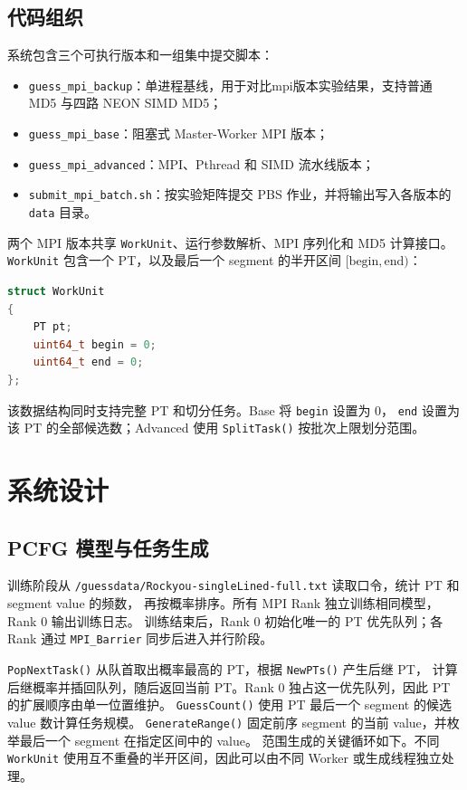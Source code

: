 \documentclass[UTF8,a4paper,12pt]{ctexart}
\newcommand{\code}[1]{\texttt{#1}}
\begin{document}
\subsection{代码组织}

系统包含三个可执行版本和一组集中提交脚本：

\begin{itemize}
  \item \code{guess\_mpi\_backup}：单进程基线，用于对比mpi版本实验结果，支持普通 MD5 与四路 NEON SIMD MD5；
  \item \code{guess\_mpi\_base}：阻塞式 Master-Worker MPI 版本；
  \item \code{guess\_mpi\_advanced}：MPI、Pthread 和 SIMD 流水线版本；
  \item \code{submit\_mpi\_batch.sh}：按实验矩阵提交 PBS 作业，并将输出写入各版本的
  \code{data} 目录。
\end{itemize}

两个 MPI 版本共享 \code{WorkUnit}、运行参数解析、MPI 序列化和 MD5 计算接口。
\code{WorkUnit} 包含一个 PT，以及最后一个 segment 的半开区间 $[\mathrm{begin},\mathrm{end})$：

\begin{lstlisting}[language=C++]
struct WorkUnit
{
    PT pt;
    uint64_t begin = 0;
    uint64_t end = 0;
};
\end{lstlisting}

该数据结构同时支持完整 PT 和切分任务。Base 将 \code{begin} 设置为 0，
\code{end} 设置为该 PT 的全部候选数；Advanced 使用 \code{SplitTask()} 按批次上限划分范围。

\section{系统设计}

\subsection{PCFG 模型与任务生成}

训练阶段从 \code{/guessdata/Rockyou-singleLined-full.txt} 读取口令，统计 PT 和 segment value 的频数，
再按概率排序。所有 MPI Rank 独立训练相同模型，Rank 0 输出训练日志。
训练结束后，Rank 0 初始化唯一的 PT 优先队列；各 Rank 通过 \code{MPI\_Barrier} 同步后进入并行阶段。

\code{PopNextTask()} 从队首取出概率最高的 PT，根据 \code{NewPTs()} 产生后继 PT，
计算后继概率并插回队列，随后返回当前 PT。Rank 0 独占这一优先队列，因此 PT 的扩展顺序由单一位置维护。
\code{GuessCount()} 使用 PT 最后一个 segment 的候选 value 数计算任务规模。
\code{GenerateRange()} 固定前序 segment 的当前 value，并枚举最后一个 segment 在指定区间中的 value。
范围生成的关键循环如下。不同 \code{WorkUnit} 使用互不重叠的半开区间，因此可以由不同 Worker
或生成线程独立处理。
\end{document}
